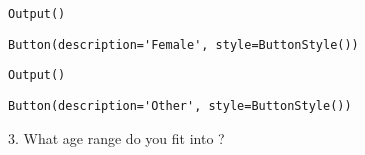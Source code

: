 \documentclass[11pt]{article}
\begin{document}
    
    
    \begin{verbatim}
Output()
    \end{verbatim}

    
    
    \begin{verbatim}
Button(description='Female', style=ButtonStyle())
    \end{verbatim}

    
    
    \begin{verbatim}
Output()
    \end{verbatim}

    
    
    \begin{verbatim}
Button(description='Other', style=ButtonStyle())
    \end{verbatim}

    
    3. What age range do you fit into ?
\end{document}
